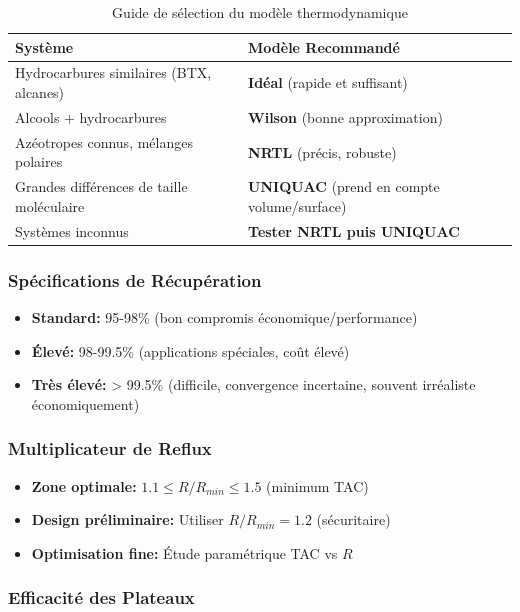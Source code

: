 \documentclass[11pt,a4paper]{article}
\begin{document}
\begin{table}[h]
\centering
\small
\begin{tabular}{lp{10cm}}
\toprule
\textbf{Système} & \textbf{Modèle Recommandé} \\
\midrule
Hydrocarbures similaires (BTX, alcanes) & \textbf{Idéal} (rapide et suffisant) \\
Alcools + hydrocarbures & \textbf{Wilson} (bonne approximation) \\
Azéotropes connus, mélanges polaires & \textbf{NRTL} (précis, robuste) \\
Grandes différences de taille moléculaire & \textbf{UNIQUAC} (prend en compte volume/surface) \\
Systèmes inconnus & \textbf{Tester NRTL puis UNIQUAC} \\
\bottomrule
\end{tabular}
\caption{Guide de sélection du modèle thermodynamique}
\end{table}

\subsubsection{Spécifications de Récupération}

\begin{itemize}[leftmargin=*]
    \item \textbf{Standard:} 95-98\% (bon compromis économique/performance)
    \item \textbf{Élevé:} 98-99.5\% (applications spéciales, coût élevé)
    \item \textbf{Très élevé:} > 99.5\% (difficile, convergence incertaine, souvent irréaliste économiquement)
\end{itemize}

\subsubsection{Multiplicateur de Reflux}

\begin{itemize}[leftmargin=*]
    \item \textbf{Zone optimale:} $1.1 \leq R/R_{min} \leq 1.5$ (minimum TAC)
    \item \textbf{Design préliminaire:} Utiliser $R/R_{min} = 1.2$ (sécuritaire)
    \item \textbf{Optimisation fine:} Étude paramétrique TAC vs $R$
\end{itemize}

\subsubsection{Efficacité des Plateaux}
\end{document}
